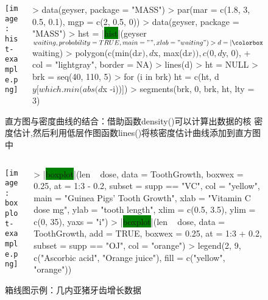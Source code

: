 \begin{frame}[c,fragile]{\subsecname}{}
\begin{figure}
 \begin{columns}
    \begin{column}[c]{.4\textwidth}
        \texttt{[image: hist-example.png]}
    \end{column}

    \begin{column}[c]{.6\textwidth}
\begin{rcode}
> data(geyser, package = "MASS")
> par(mar = c(1.8, 3, 0.5, 0.1), mgp = c(2, 0.5, 0))
> data(geyser, package = "MASS")
> hst = |\colorbox{green}{hist}|(geyser$waiting, probability = TRUE, main = "", xlab = "waiting")
> d = |\colorbox{green}{density}|(geyser$waiting)
> polygon(c(min(d$x), d$x, max(d$x)), c(0, d$y, 0),
+ col = "lightgray", border = NA)
> lines(d)
> ht = NULL
> brk = seq(40, 110, 5)
> for (i in brk) ht = c(ht, d$y[which.min(abs(d$x -i))])
> segments(brk, 0, brk, ht, lty = 3)
\end{rcode}
    \end{column}
  \end{columns}
  \caption{直方图与密度曲线的结合：借助函数density()可以计算出数据的核
密度估计,然后利用低层作图函数lines()将核密度估计曲线添加到直方图中}
\end{figure}
\end{frame}

\begin{frame}[c,fragile]{\subsecname}{}
\begin{figure}
 \begin{columns}
    \begin{column}[c]{.4\textwidth}
        \texttt{[image: boxplot-example.png]}
    \end{column}

    \begin{column}[c]{.6\textwidth}
\begin{rcode}
> |\colorbox{green}{boxplot}|(len ~ dose, data = ToothGrowth,
          boxwex = 0.25, at = 1:3 - 0.2,
          subset = supp == "VC", col = "yellow",
          main = "Guinea Pigs' Tooth Growth",
          xlab = "Vitamin C dose mg",
          ylab = "tooth length",
          xlim = c(0.5, 3.5), ylim = c(0, 35), yaxs = "i")
> |\colorbox{green}{boxplot}|(len ~ dose, data = ToothGrowth, add = TRUE,
          boxwex = 0.25, at = 1:3 + 0.2,
          subset = supp == "OJ", col = "orange")
> legend(2, 9, c("Ascorbic acid", "Orange juice"), fill = c("yellow", "orange"))
\end{rcode}
    \end{column}
  \end{columns}
  \caption{箱线图示例：几内亚猪牙齿增长数据}
\end{figure}
\end{frame}

